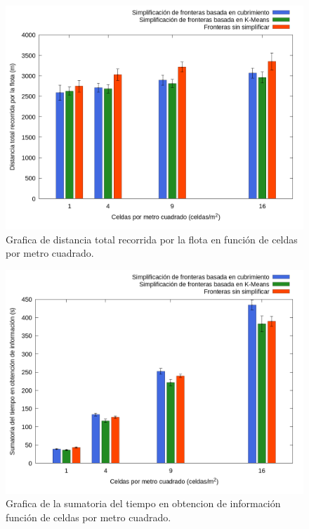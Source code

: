 \begin{figure}[H]
  \centerfloat

  \includegraphics[clip=true, width=\graphlen]{imagenes/graficas_chicas/graficas_histo_num/ident_obj/exploration_cost.png}

  \caption{Grafica de distancia total recorrida por la flota en función de celdas por metro cuadrado.}\label{fig:gra:idobj:ec}

\end{figure}

\begin{figure}[H]
  \centerfloat

  \includegraphics[clip=true, width=\graphlen]{imagenes/graficas_chicas/graficas_histo_num/ident_obj/auction_info_time_sum.png}

  \caption{Grafica de la sumatoria del tiempo en obtencion de información función de celdas por metro cuadrado.}\label{fig:gra:idobj:iobt}

\end{figure}

